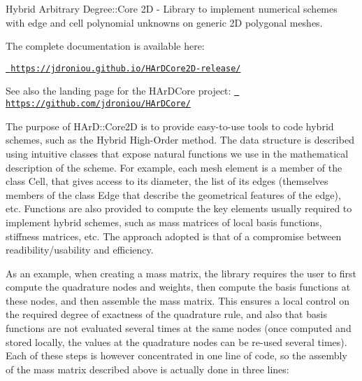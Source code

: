Hybrid Arbitrary Degree\+::\+Core 2D -\/ Library to implement numerical schemes with edge and cell polynomial unknowns on generic 2D polygonal meshes.

The complete documentation is available here\+:

\href{https://jdroniou.github.io/HArDCore2D-release/}{\texttt{ https\+://jdroniou.\+github.\+io/\+HAr\+DCore2\+D-\/release/}}

See also the landing page for the HAr\+DCore project\+: \href{https://github.com/jdroniou/HArDCore/}{\texttt{ https\+://github.\+com/jdroniou/\+HAr\+DCore/}}

The purpose of HAr\+D\+::\+Core2D is to provide easy-\/to-\/use tools to code hybrid schemes, such as the Hybrid High-\/\+Order method. The data structure is described using intuitive classes that expose natural functions we use in the mathematical description of the scheme. For example, each mesh element is a member of the class \textquotesingle{}Cell\textquotesingle{}, that gives access to its diameter, the list of its edges (themselves members of the class \textquotesingle{}Edge\textquotesingle{} that describe the geometrical features of the edge), etc. Functions are also provided to compute the key elements usually required to implement hybrid schemes, such as mass matrices of local basis functions, stiffness matrices, etc. The approach adopted is that of a compromise between readibility/usability and efficiency.

As an example, when creating a mass matrix, the library requires the user to first compute the quadrature nodes and weights, then compute the basis functions at these nodes, and then assemble the mass matrix. This ensures a local control on the required degree of exactness of the quadrature rule, and also that basis functions are not evaluated several times at the same nodes (once computed and stored locally, the values at the quadrature nodes can be re-\/used several times). Each of these steps is however concentrated in one line of code, so the assembly of the mass matrix described above is actually done in three lines\+:


\begin{DoxyCode}{0}

\end{DoxyCode}


